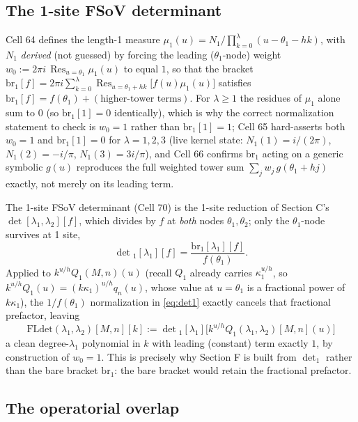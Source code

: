 \documentclass[11pt]{article}
\begin{document}
\subsection{The 1-site FSoV determinant}

Cell 64 defines the length-1 measure $\mu_1(u) = N_1/\prod_{k=0}^{\lambda}(u-\theta_1-hk)$, with
$N_1$ \emph{derived} (not guessed) by forcing the leading ($\theta_1$-node) weight
$w_0 := 2\pi i\,\operatorname{Res}_{u=\theta_1}\mu_1(u)$ to equal $1$, so that the bracket
$\mathrm{br}_1[f] = 2\pi i\sum_{k=0}^{\lambda}\operatorname{Res}_{u=\theta_1+hk}\bigl[f(u)\mu_1(u)\bigr]$
satisfies $\mathrm{br}_1[f] = f(\theta_1) + (\text{higher-tower terms})$. For $\lambda\ge1$ the
residues of $\mu_1$ alone sum to $0$ (so $\mathrm{br}_1[1]=0$ identically), which is why the correct
normalization statement to check is $w_0=1$ rather than $\mathrm{br}_1[1]=1$; Cell 65 hard-asserts
both $w_0=1$ and $\mathrm{br}_1[1]=0$ for $\lambda=1,2,3$ (live kernel state:
$N_1(1)=i/(2\pi)$, $N_1(2)=-i/\pi$, $N_1(3)=3i/\pi$), and Cell 66 confirms $\mathrm{br}_1$ acting on
a generic symbolic $g(u)$ reproduces the full weighted tower sum $\sum_j w_j\,g(\theta_1+hj)$
exactly, not merely on its leading term.

The 1-site FSoV determinant (Cell 70) is the 1-site reduction of Section C's $\det[\lambda_1,
\lambda_2][f]$, which divides by $f$ at \emph{both} nodes $\theta_1,\theta_2$; only the
$\theta_1$-node survives at 1 site,
\begin{equation}
  \det{}_1[\lambda_1][f] = \frac{\mathrm{br}_1[\lambda_1][f]}{f(\theta_1)}.
  \label{eq:det1}
\end{equation}
Applied to $k^{u/h}Q_1(M,n)(u)$ (recall $Q_1$ already carries $\kappa_1^{u/h}$, so
$k^{u/h}Q_1(u) = (k\kappa_1)^{u/h}q_n(u)$, whose value at $u=\theta_1$ is a fractional power of
$k\kappa_1$), the $1/f(\theta_1)$ normalization in \eqref{eq:det1} exactly cancels that fractional
prefactor, leaving
\begin{equation}
  \mathrm{FLdet}(\lambda_1,\lambda_2)[M,n][k] := \det{}_1[\lambda_1]\bigl[k^{u/h}Q_1(\lambda_1,\lambda_2)[M,n](u)\bigr]
  \label{eq:fldet}
\end{equation}
a clean degree-$\lambda_1$ polynomial in $k$ with leading (constant) term exactly $1$, by
construction of $w_0=1$. This is precisely why Section F is built from $\det_1$ rather than the bare
bracket $\mathrm{br}_1$: the bare bracket would retain the fractional prefactor.

\subsection{The operatorial overlap}
\end{document}
